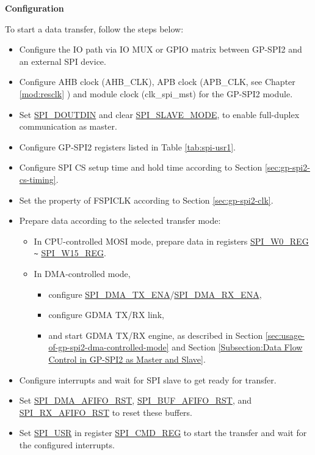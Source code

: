 \documentclass[main\_\_EN.tex]{subfiles}
\begin{document}
\textbf{Configuration}

To start a data transfer, follow the steps below:
\begin{itemize}
    \item Configure the IO path via IO MUX or GPIO matrix between GP-SPI2 and an external SPI device. 
    \item Configure AHB clock (AHB\_CLK), APB clock (APB\_CLK, see Chapter \ref{mod:resclk} \textit{}) and module clock (clk\_spi\_mst) for the GP-SPI2 module.
    \item Set \hyperref[fielddesc:SPIDOUTDIN]{SPI\_DOUTDIN} and clear \hyperref[fielddesc:SPISLAVEMODE]{SPI\_SLAVE\_MODE}, to enable full-duplex communication as master.
    
    \item Configure GP-SPI2 registers listed in Table \ref{tab:spi-usr1}.
    
    \item Configure SPI CS setup time and hold time according to Section \ref{sec:gp-spi2-cs-timing}.
    
    \item Set the property of FSPICLK according to Section \ref{sec:gp-spi2-clk}. 
    
    \item Prepare data according to the selected transfer mode:
    \begin{itemize}
        \item In CPU-controlled MOSI mode, prepare data in registers \hyperref[regdesc:SPIW0REG]{SPI\_W0\_REG} \verb+~+ \hyperref[regdesc:SPIW0REG]{SPI\_W15\_REG}. 
        
        \item In DMA-controlled mode, 
        \begin{itemize}
            \item configure \hyperref[fielddesc:SPIDMATXENA]{SPI\_DMA\_TX\_ENA}/\hyperref[fielddesc:SPIDMARXENA]{SPI\_DMA\_RX\_ENA},
            \item configure GDMA TX/RX link,
            \item and start GDMA TX/RX engine, as described in Section \ref{sec:usage-of-gp-spi2-dma-controlled-mode} and Section \ref{Subsection:Data Flow Control in GP-SPI2 as Master and Slave}.
        \end{itemize}
    \end{itemize}
    
    \item Configure interrupts \label{step:master-interrupt-fd} and wait for SPI slave to get ready for transfer.
    
    \item Set \hyperref[fielddesc:SPIDMAAFIFORST]{SPI\_DMA\_AFIFO\_RST}, \hyperref[fielddesc:SPIBUFAFIFORST]{SPI\_BUF\_AFIFO\_RST}, and \hyperref[fielddesc:SPIRXAFIFORST]{SPI\_RX\_AFIFO\_RST} to reset these buffers.

    \item Set \hyperref[fielddesc:SPIUSR]{SPI\_USR} in register \hyperref[regdesc:SPICMDREG]{SPI\_CMD\_REG} to start the transfer and wait for the configured interrupts.

\end{itemize}
\end{document}
